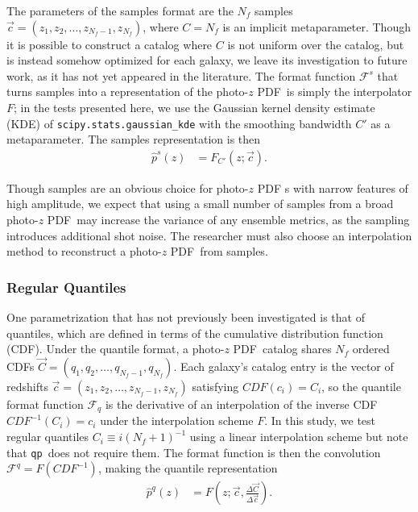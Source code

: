 \documentclass[\docopts]{\docclass}
\newcommand{\qp}{\texttt{qp}\xspace}
\newcommand{\pz}{photo-$z$ PDF\xspace}
\begin{document}
The parameters of the samples format are the $N_{f}$ samples $\vec{c}=(z_{1}, 
z_{2}, \dots, z_{N_{f}-1}, z_{N_{f}})$, where $C=N_{f}$ is an implicit 
metaparameter.
Though it is possible to construct a catalog where $C$ is not uniform over the 
catalog, but is instead somehow optimized for each galaxy, we leave its 
investigation to future work, as it has not yet appeared in the literature.
The format function $\mathcal{F}^{s}$ that turns samples into a representation 
of the \pz\ is simply the interpolator $F$; in the tests presented here, we use 
the Gaussian kernel density estimate (KDE) of 
\texttt{scipy.stats.gaussian\_kde} with the smoothing bandwidth $C'$ as a 
metaparameter.  The samples representation is then
\begin{align}
  \label{eq:sampled}
  \hat{p}^{s}(z) &= F_{C'}(z; \vec{c}).
\end{align}

Though samples are an obvious choice for \pz s with narrow features of high 
amplitude, we expect that using a small number of samples from a broad \pz\ may 
increase the variance of any ensemble metrics, as the sampling introduces 
additional shot noise.
The researcher must also choose an interpolation method to reconstruct a \pz\ 
from samples.

\subsubsection{Regular Quantiles}
\label{sec:quantiles}

One parametrization that has not previously been investigated is that of 
quantiles, which are defined in terms of the cumulative distribution function 
(CDF).
Under the quantile format, a \pz\ catalog shares $N_{f}$ ordered CDFs 
$\vec{C}=(q_{1}, q_{2}, \dots, q_{N_{f}-1}, q_{N_{f}})$.
Each galaxy's catalog entry is the vector of redshifts $\vec{c}=(z_{1}, z_{2}, 
\dots, z_{N_{f}-1}, z_{N_{f}})$ satisfying $CDF(c_{i})=C_{i}$, so the quantile 
format function $\mathcal{F}_{q}$ is the derivative of an interpolation of the 
inverse CDF $CDF^{-1}(C_{i})=c_{i}$ under the interpolation scheme $F$.
In this study, we test regular quantiles $C_{i}\equiv i(N_{f}+1)^{-1}$ using a 
linear interpolation scheme but note that \qp\ does not require them.
The format function is then the convolution $\mathcal{F}^{q}=F(CDF^{-1})$, 
making the quantile representation
\begin{align}
  \label{eq:quantiles}
  \hat{p}^{q}(z) &= F(z; \vec{c}, \frac{\Delta\vec{C}}{\Delta\vec{c}}).
\end{align}
\end{document}
